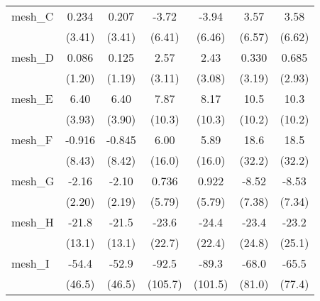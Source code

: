 \begin{tabular}{lcccccc}
   mesh\_C                                                     & 0.234        & 0.207         & -3.72         & -3.94          & 3.57           & 3.58\\   
                                                               & (3.41)       & (3.41)        & (6.41)        & (6.46)         & (6.57)         & (6.62)\\   
   mesh\_D                                                     & 0.086        & 0.125         & 2.57          & 2.43           & 0.330          & 0.685\\   
                                                               & (1.20)       & (1.19)        & (3.11)        & (3.08)         & (3.19)         & (2.93)\\   
   mesh\_E                                                     & 6.40         & 6.40          & 7.87          & 8.17           & 10.5           & 10.3\\   
                                                               & (3.93)       & (3.90)        & (10.3)        & (10.3)         & (10.2)         & (10.2)\\   
   mesh\_F                                                     & -0.916       & -0.845        & 6.00          & 5.89           & 18.6           & 18.5\\   
                                                               & (8.43)       & (8.42)        & (16.0)        & (16.0)         & (32.2)         & (32.2)\\   
   mesh\_G                                                     & -2.16        & -2.10         & 0.736         & 0.922          & -8.52          & -8.53\\   
                                                               & (2.20)       & (2.19)        & (5.79)        & (5.79)         & (7.38)         & (7.34)\\   
   mesh\_H                                                     & -21.8        & -21.5         & -23.6         & -24.4          & -23.4          & -23.2\\   
                                                               & (13.1)       & (13.1)        & (22.7)        & (22.4)         & (24.8)         & (25.1)\\   
   mesh\_I                                                     & -54.4        & -52.9         & -92.5         & -89.3          & -68.0          & -65.5\\   
                                                               & (46.5)       & (46.5)        & (105.7)       & (101.5)        & (81.0)         & (77.4)\\   

\end{tabular}
